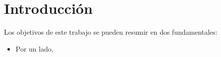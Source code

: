 \chapter{Introducción}

Los objetivos de este trabajo se pueden resumir en dos fundamentales:

\begin{itemize}
    \item Por un lado, 
\end{itemize}